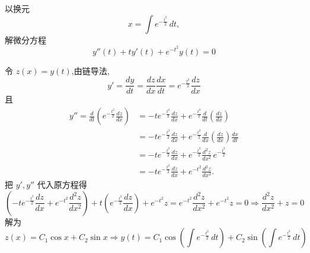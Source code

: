 \begin{questions}
    \question 以换元 
    \[
    x=\int e^{-\frac{t^2}{2}}\,dt,
    \]
    解微分方程
    \[
    y''(t)+t y'(t) + e^{-t^2} y(t)=0
    \]
    \begin{solution}
        令 $z(x)=y(t)$,由链导法,
        \[
        y'=\frac{dy}{dt}=\frac{dz}{dx}\frac{dx}{dt}=e^{-\frac{t^2}{2}}\frac{dz}{dx}
        \]
        且
        \begin{align*}
        y'' = \frac{d}{dt}\left(e^{-\frac{t^2}{2}}\frac{dz}{dx}\right) 
        &= -t e^{-\frac{t^2}{2}}\frac{dz}{dx} 
        + e^{-\frac{t^2}{2}}\frac{d}{dt}\left(\frac{dz}{dx}\right) \\
        &= -t e^{-\frac{t^2}{2}}\frac{dz}{dx}
        + e^{-\frac{t^2}{2}}\frac{d}{dx}\left(\frac{dz}{dx}\right)\frac{dx}{dt} \\
        &= -t e^{-\frac{t^2}{2}}\frac{dz}{dx}
        + e^{-\frac{t^2}{2}} \frac{d^2z}{dx^2} \, e^{-\frac{t^2}{2}} \\
        &= -t e^{-\frac{t^2}{2}}\frac{dz}{dx}
        + e^{-t^2}\frac{d^2z}{dx^2}.
        \end{align*}
        把 $y',y''$ 代入原方程得
        \[
        \left(-t e^{-\frac{t^2}{2}}\frac{dz}{dx} + e^{-t^2}\frac{d^2z}{dx^2}\right)
        + t\left(e^{-\frac{t^2}{2}}\frac{dz}{dx}\right) + e^{-t^2}z 
        = e^{-t^2}\frac{d^2z}{dx^2} + e^{-t^2}z = 0 \Rightarrow \frac{d^2z}{dx^2} + z = 0
        \]
        解为
        \[
        z(x)=C_1\cos x + C_2\sin x \Rightarrow y(t)=C_1\cos\left(\int e^{-\frac{t^2}{2}}\,dt\right)+C_2\sin\left(\int e^{-\frac{t^2}{2}}\,dt\right)
        \]
    \end{solution}


\end{questions}
